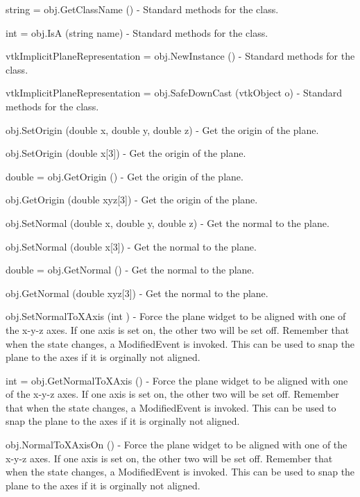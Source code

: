 \begin{DoxyItemize}
\item {\ttfamily string = obj.\-Get\-Class\-Name ()} -\/ Standard methods for the class.  
\item {\ttfamily int = obj.\-Is\-A (string name)} -\/ Standard methods for the class.  
\item {\ttfamily vtk\-Implicit\-Plane\-Representation = obj.\-New\-Instance ()} -\/ Standard methods for the class.  
\item {\ttfamily vtk\-Implicit\-Plane\-Representation = obj.\-Safe\-Down\-Cast (vtk\-Object o)} -\/ Standard methods for the class.  
\item {\ttfamily obj.\-Set\-Origin (double x, double y, double z)} -\/ Get the origin of the plane.  
\item {\ttfamily obj.\-Set\-Origin (double x\mbox{[}3\mbox{]})} -\/ Get the origin of the plane.  
\item {\ttfamily double = obj.\-Get\-Origin ()} -\/ Get the origin of the plane.  
\item {\ttfamily obj.\-Get\-Origin (double xyz\mbox{[}3\mbox{]})} -\/ Get the origin of the plane.  
\item {\ttfamily obj.\-Set\-Normal (double x, double y, double z)} -\/ Get the normal to the plane.  
\item {\ttfamily obj.\-Set\-Normal (double x\mbox{[}3\mbox{]})} -\/ Get the normal to the plane.  
\item {\ttfamily double = obj.\-Get\-Normal ()} -\/ Get the normal to the plane.  
\item {\ttfamily obj.\-Get\-Normal (double xyz\mbox{[}3\mbox{]})} -\/ Get the normal to the plane.  
\item {\ttfamily obj.\-Set\-Normal\-To\-X\-Axis (int )} -\/ Force the plane widget to be aligned with one of the x-\/y-\/z axes. If one axis is set on, the other two will be set off. Remember that when the state changes, a Modified\-Event is invoked. This can be used to snap the plane to the axes if it is orginally not aligned.  
\item {\ttfamily int = obj.\-Get\-Normal\-To\-X\-Axis ()} -\/ Force the plane widget to be aligned with one of the x-\/y-\/z axes. If one axis is set on, the other two will be set off. Remember that when the state changes, a Modified\-Event is invoked. This can be used to snap the plane to the axes if it is orginally not aligned.  
\item {\ttfamily obj.\-Normal\-To\-X\-Axis\-On ()} -\/ Force the plane widget to be aligned with one of the x-\/y-\/z axes. If one axis is set on, the other two will be set off. Remember that when the state changes, a Modified\-Event is invoked. This can be used to snap the plane to the axes if it is orginally not aligned.  

\end{DoxyItemize}
